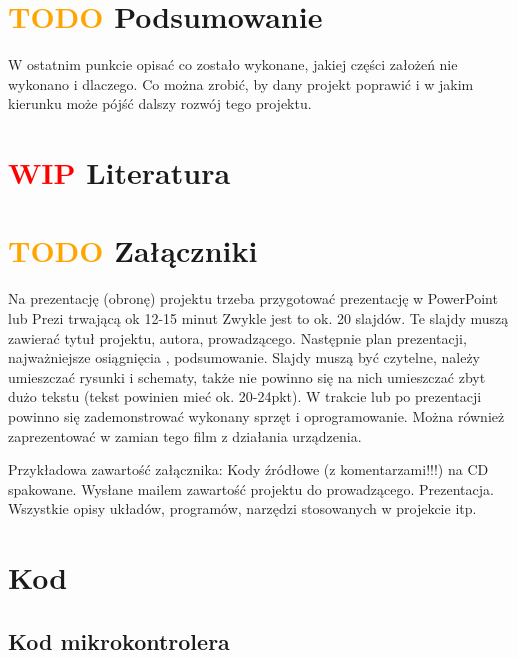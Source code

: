 \documentclass[11pt,titlepage,a4paper]{article}
\begin{document}
\section{\textcolor{orange}{TODO} Podsumowanie}

W ostatnim punkcie opisać co zostało wykonane, jakiej części założeń nie wykonano i dlaczego. Co można zrobić, by dany projekt poprawić i w jakim kierunku może pójść dalszy rozwój tego projektu.

\newpage

\section{\textcolor{red}{WIP}  Literatura}

\printbibliography[heading=none]

\newpage

\section{\textcolor{orange}{TODO} Załączniki}

Na prezentację (obronę) projektu trzeba przygotować prezentację w PowerPoint lub Prezi trwającą ok 12-15 minut Zwykle jest to ok. 20 slajdów. Te slajdy muszą zawierać tytuł projektu, autora, prowadzącego. Następnie plan prezentacji, najważniejsze osiągnięcia , podsumowanie. Slajdy muszą być czytelne, należy umieszczać rysunki i schematy, także nie powinno się na nich umieszczać zbyt dużo tekstu (tekst powinien mieć ok. 20-24pkt). W trakcie lub po prezentacji powinno się zademonstrować wykonany sprzęt i oprogramowanie. Można również zaprezentować w zamian tego film z działania urządzenia.

Przykładowa zawartość załącznika:
Kody źródłowe (z komentarzami!!!) na CD spakowane.
Wysłane mailem zawartość projektu do prowadzącego.
Prezentacja.
Wszystkie opisy układów, programów, narzędzi stosowanych w projekcie itp.

\newpage

\section{Kod}

\subsection{Kod mikrokontrolera}


\end{document}
